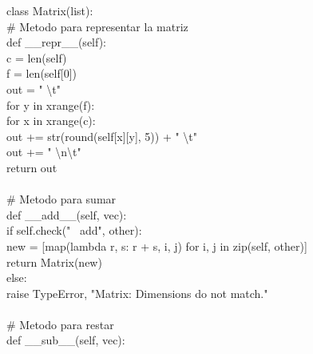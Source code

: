 \documentclass[10pt,letterpaper]{article}
\newenvironment{Code}
{
\begin{lrbox}{\selvestebox}%
\begin{minipage}{\dimexpr\columnwidth-2\fboxsep\relax}
\fontfamily{\ttdefault}\selectfont
}
{\end{minipage}\end{lrbox}%
\begin{center}
\colorbox{light-gray}{\usebox{\selvestebox}}
\end{center}
}
\begin{document}
\begin{scriptsize}
\begin{Code}
class Matrix(list):\\
\hspace*{5mm} \# Metodo para representar la matriz\\
\hspace*{5mm} def \_\_repr\_\_(self):\\
\hspace*{11mm} c = len(self)\\
\hspace*{11mm} f = len(self[0])\\
\hspace*{11mm} out = " \textbackslash t"\\
\hspace*{11mm} for y in xrange(f):\\
\hspace*{17mm} for x in xrange(c):\\
\hspace*{23mm} out += str(round(self[x][y], 5)) + " \textbackslash t"\\
\hspace*{17mm} out += " \textbackslash n\textbackslash t"\\
\hspace*{11mm} return out\\
\\
\hspace*{5mm} \# Metodo para sumar\\
\hspace*{5mm} def \_\_add\_\_(self, vec):\\
\hspace*{11mm} if self.check("\ \hspace*{-3mm} add", other):\\
\hspace*{17mm} new = [map(lambda r, s: r + s, i, j) for i, j in zip(self, other)]\\
\hspace*{17mm} return Matrix(new)\\
\hspace*{11mm} else:\\
\hspace*{17mm} raise TypeError, "Matrix: Dimensions do not match."\\
\\
\hspace*{5mm} \# Metodo para restar\\
\hspace*{5mm} def \_\_sub\_\_(self, vec):\\

\end{Code}
\end{scriptsize}
\end{document}
